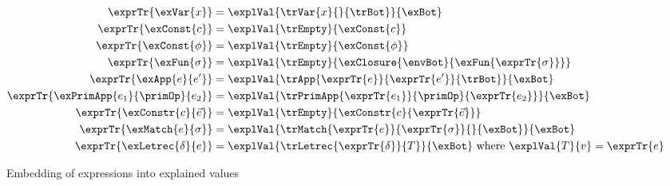 \begin{figure}
\begin{align*}
\exprTr{\exVar{x}}
&=
\explVal{\trVar{x}{}{\trBot}}{\exBot}
\\
\exprTr{\exConst{c}}
&=
\explVal{\trEmpty}{\exConst{c}}
\\
\exprTr{\exConst{\phi}}
&=
\explVal{\trEmpty}{\exConst{\phi}}
\\
\exprTr{\exFun{\sigma}}
&=
\explVal{\trEmpty}{\exClosure{\envBot}{\exFun{\exprTr{\sigma}}}}
\\
\exprTr{\exApp{e}{e'}}
&=
\explVal{\trApp{\exprTr{e}}{\exprTr{e'}}{\trBot}}{\exBot}
\\
\exprTr{\exPrimApp{e_1}{\primOp}{e_2}}
&=
\explVal{\trPrimApp{\exprTr{e_1}}{\primOp}{\exprTr{e_2}}}{\exBot}
\\
\exprTr{\exConstr{c}{\vec{e}}}
&=
\explVal{\trEmpty}{\exConstr{c}{\exprTr{\vec{e}}}}
\\
\exprTr{\exMatch{e}{\sigma}}
&=
\explVal{\trMatch{\exprTr{e}}{\exprTr{\sigma}}{}{\exBot}}{\exBot}
\\
\exprTr{\exLetrec{\delta}{e}}
&=
\explVal{\trLetrec{\exprTr{\delta}}{T}}{\exBot}
\text{ where }
\explVal{T}{v} = \exprTr{e}
\end{align*}
\caption{Embedding of expressions into explained values}
\end{figure}
